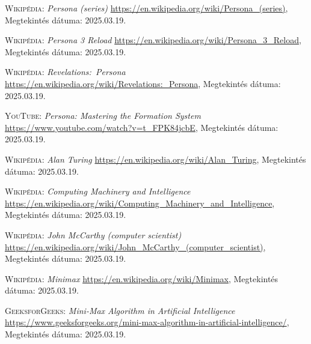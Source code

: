 \documentclass[
]{thesis-ekf}
\theoremstyle{definition}
\theoremstyle{remark}
\begin{document}
\begin{thebibliography}{2}

\textsc{Wikipédia:} \emph{Persona (series)} 
\url{https://en.wikipedia.org/wiki/Persona_(series)}, Megtekintés dátuma: 2025.03.19.

\textsc{Wikipédia:} \emph{Persona 3 Reload} 
\url{https://en.wikipedia.org/wiki/Persona_3_Reload}, Megtekintés dátuma: 2025.03.19.

\textsc{Wikipédia:} \emph{Revelations:~Persona} 
\url{https://en.wikipedia.org/wiki/Revelations:_Persona}, Megtekintés dátuma: 2025.03.19.

\textsc{YouTube:} \emph{Persona: Mastering the Formation System} 
\url{https://www.youtube.com/watch?v=t_FPK84jcbE}, Megtekintés dátuma: 2025.03.19.

\textsc{Wikipédia:} \emph{Alan Turing} 
\url{https://en.wikipedia.org/wiki/Alan_Turing}, Megtekintés dátuma: 2025.03.19.

\textsc{Wikipédia:} \emph{Computing Machinery and Intelligence} 
\url{https://en.wikipedia.org/wiki/Computing_Machinery_and_Intelligence}, Megtekintés dátuma: 2025.03.19.

\textsc{Wikipédia:} \emph{John McCarthy (computer scientist)} 
\url{https://en.wikipedia.org/wiki/John_McCarthy_(computer_scientist)}, Megtekintés dátuma: 2025.03.19.

\textsc{Wikipédia:} \emph{Minimax} 
\url{https://en.wikipedia.org/wiki/Minimax}, Megtekintés dátuma: 2025.03.19.

\textsc{GeeksforGeeks:} \emph{Mini-Max Algorithm in Artificial Intelligence} 
\url{https://www.geeksforgeeks.org/mini-max-algorithm-in-artificial-intelligence/}, Megtekintés dátuma: 2025.03.19.




\end{thebibliography}


\end{document}
